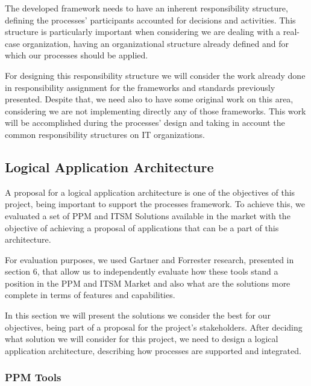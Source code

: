 The developed framework needs to have an inherent responsibility structure, defining the processes' participants accounted for decisions and activities. This structure is particularly important when considering we are dealing with a real-case organization, having an organizational structure already defined and for which our processes should be applied.\par
For designing this responsibility structure we will consider the work already done in responsibility assignment for the frameworks and standards previously presented. Despite that, we need also to have some original work on this area, considering we are not implementing directly any of those frameworks. This work will be accomplished during the processes' design and taking in account the common responsibility structures on IT organizations.\par 

\subsection{Logical Application Architecture}

A proposal for a logical application architecture is one of the objectives of this project, being important to support the processes framework. To achieve this, we evaluated a set of PPM and ITSM Solutions available in the market with the objective of achieving a proposal of applications that can be a part of this architecture.\par
For evaluation purposes, we used Gartner and Forrester research, presented in section 6, that allow us to independently evaluate how these tools stand a position in the PPM and ITSM Market and also what are the solutions more complete in terms of features and capabilities.\par
In this section we will present the solutions we consider the best for our objectives, being part of a proposal for the project's stakeholders. After deciding what solution we will consider for this project, we need to design a logical application architecture, describing how processes are supported and integrated.\par

\subsubsection{PPM Tools}

